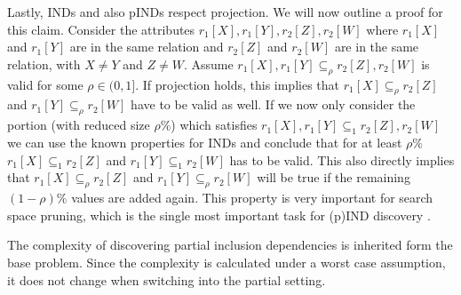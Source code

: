 Lastly, INDs and also pINDs respect projection. We will now outline a proof for this claim. Consider the attributes $r_1[X], r_1[Y], r_2[Z], r_2[W]$ where $r_1[X]$ and $r_1[Y]$ are in the same relation and $r_2[Z]$ and $r_2[W]$ are in the same relation, with $X \not = Y$ and $Z \not = W$. Assume $r_1[X], r_1[Y] \subseteq_\rho r_2[Z], r_2[W]$ is valid for some $\rho \in (0, 1]$. If projection holds, this implies that $r_1[X] \subseteq_\rho r_2[Z]$ and $r_1[Y] \subseteq_\rho r_2[W]$ have to be valid as well. If we now only consider the portion (with reduced size $\rho\%$) which satisfies $r_1[X], r_1[Y] \subseteq_1 r_2[Z], r_2[W]$ we can use the known properties for INDs and conclude that for at least $\rho\%$ $r_1[X] \subseteq_1 r_2[Z]$ and $r_1[Y] \subseteq_1 r_2[W]$ has to be valid. This also directly implies that $r_1[X] \subseteq_\rho r_2[Z]$ and $r_1[Y] \subseteq_\rho r_2 [W]$ will be true if the remaining $(1-\rho)\%$ values are added again. This property is very important for search space pruning, which is the single most important task for (p)IND discovery \cite{liu2010discover}.

The complexity of discovering partial inclusion dependencies is inherited form the base problem. Since the complexity is calculated under a worst case assumption, it does not change when switching into the partial setting.

